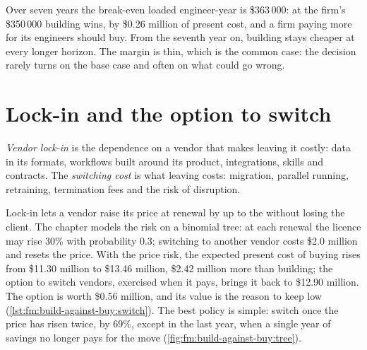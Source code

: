 Over seven years the break-even loaded engineer-year is \$363\,000: at the firm's \$350\,000 building wins, by \$0.26 million of present cost,
and a firm paying more for its engineers should buy. From the seventh year on, building stays cheaper at every longer horizon. The margin is thin,
which is the common case: the decision rarely turns on the base case and often on what could go wrong.

\section{Lock-in and the option to switch}

\begin{definition}\label{def:fm:build-against-buy:lockin}
\emph{Vendor lock-in} is the dependence on a vendor that makes leaving it costly: data in its formats, workflows built around
its product, integrations, skills and contracts. The \emph{switching cost} is what leaving costs: migration, parallel running,
retraining, termination fees and the risk of disruption.
\end{definition}

Lock-in lets a vendor raise its price at renewal by up to the  without losing the client. The chapter models the risk on a binomial
tree: at each renewal the licence may rise 30\% with probability 0.3; switching to another vendor costs \$2.0 million and resets the price. With
the price risk, the expected present cost of buying rises from \$11.30 million to \$13.46 million, \$2.42 million more than building; the option to
switch vendors, exercised when it pays, brings it back to \$12.90 million. The option is worth \$0.56 million, and its value is the reason to keep
 low (\cref{lst:fm:build-against-buy:switch}). The best policy is simple: switch once the price has risen twice, by 69\%,
except in the last year, when a single year of savings no longer pays for the move (\cref{fig:fm:build-against-buy:tree}).

\label{lst:fm:build-against-buy:switch}

